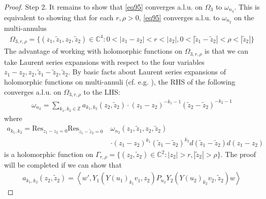\documentclass[11pt,b5paper,notitlepage]{article}
\theoremstyle{definition}
\theoremstyle{plain}
\newcommand{\wtd}{\widetilde}
\newcommand{\Res}{\mathrm{Res}}
\newcommand{\Cbb}{\mathbb C}
\newcommand{\Zbb}{\mathbb Z}
\newcommand{\<}{\left\langle}
\renewcommand{\>}{\right\rangle}
\numberwithin{equation}{subsection}
\begin{document}
\begin{proof}
Step 2. It remains to show that \eqref{eq95} converges a.l.u. on $\Omega_3$ to $\omega_{n_3}$. This is equivalent to showing that for each $r,\rho>0$, \eqref{eq95} converges a.l.u. to $\omega_{n_2}$ on the multi-annulus
\begin{align}
\Omega_{3,r,\rho}=\{(z_1,\wtd z_1,z_2,\wtd z_2)\in\Cbb^4:0<|z_1-z_2|<r<|z_2|,0<|\wtd z_1-\wtd z_2|<\rho<|\wtd z_2|\}
\end{align}
The advantage of working with holomorphic functions on $\Omega_{3,r,\rho}$ is that we can take Laurent series expansions with respect to the four variables $z_1-z_2,z_2,\wtd z_1-\wtd z_2,\wtd z_2$. By basic facts about Laurent series expansions of holomorphic functions on multi-annuli (cf. e.g. \cite[Lem. 7.13]{GuiLec}), the RHS of the following converges a.l.u. on $\Omega_{3,r,\rho}$ to the LHS:
\begin{align*}
\omega_{n_2}=\sum_{k_1,k_2\in\Zbb} a_{k_1,k_2}(z_2,\wtd z_2)\cdot (z_1-z_2)^{-k_1-1}(\wtd z_2-\wtd z_2)^{-k_2-1}
\end{align*}
where
\begin{align*}
a_{k_1,k_2}=\Res_{z_1-z_2=0}\Res_{\wtd z_1-\wtd z_2=0}~&\omega_{n_2}(z_1,\wtd z_1,z_2,\wtd z_2)\\
&\cdot (z_1-z_2)^{k_1}(\wtd z_1-\wtd z_2)^{k_2}d(\wtd z_1-\wtd z_2)d(z_1-z_2)
\end{align*}
is a holomorphic function on $\Gamma_{r,\rho}=\{(z_2,\wtd z_2)\in\Cbb^2:|z_2|>r,|\wtd z_2|>\rho\}$. The proof will be completed if we can show that
\begin{align}
a_{k_1,k_2}(z_2,\wtd z_2)=\<w',Y_1(Y(u_1)_{k_1}v_1,z_2)P_{n_2}Y_2(Y(u_2)_{k_2}v_2,\wtd z_2)w\>  \label{eq97}
\end{align}



\end{proof}
\end{document}
